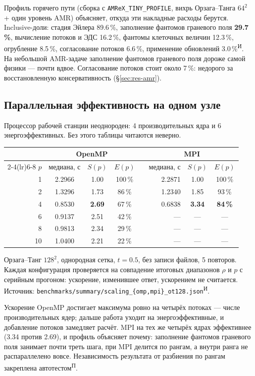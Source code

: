 \documentclass[12pt,a4paper]{article}
\newcommand{\code}[1]{\texttt{#1}}
\newcommand{\Pv}{\textsuperscript{\scriptsize П}}   %
\newcommand{\Iz}{\textsuperscript{\scriptsize И}}    %
\begin{document}
Профиль горячего пути (сборка с \code{AMReX\_TINY\_PROFILE}, вихрь
Орзага--Танга $64^2$ + один уровень AMR) объясняет, откуда эти накладные расходы
берутся. Inclusive-доли: стадия Эйлера 89.6\,\%, заполнение фантомов граневого
поля \textbf{29.7\,\%}, вычисление потоков и ЭДС 16.2\,\%, фантомы клеточных
величин 12.3\,\%, огрубление 8.5\,\%, согласование потоков 6.6\,\%, применение
обновлений 3.0\,\%\Iz. На небольшой AMR-задаче заполнение фантомов граневого поля
дороже самой физики --- почти вдвое. Согласование потоков стоит около 7\,\%:
недорого за восстановленную консервативность (\S\ref{sec:res-amr}).

\subsection{Параллельная эффективность на одном узле}
\label{sec:res-scaling}

Процессор рабочей станции неоднороден: 4 производительных ядра и 6
энергоэффективных. Без этого таблицы читаются неверно.

\begin{center}\footnotesize
\begin{tabular}{rccccrcc}
\toprule
& \multicolumn{3}{c}{OpenMP} & & \multicolumn{3}{c}{MPI} \\
\cmidrule(lr){2-4}\cmidrule(lr){6-8}
$p$ & медиана, с & $S(p)$ & $E(p)$ & & медиана, с & $S(p)$ & $E(p)$ \\
\midrule
1  & 2.2966 & 1.00 & 100\,\% & & 2.2871 & 1.00 & 100\,\% \\
2  & 1.3296 & 1.73 & 86\,\%  & & 1.2340 & 1.85 & 93\,\% \\
4  & 0.8530 & \textbf{2.69} & 67\,\% & & 0.6838 & \textbf{3.34} & \textbf{84\,\%} \\
6  & 0.9137 & 2.51 & 42\,\%  & & --- & --- & --- \\
8  & 0.9813 & 2.34 & 29\,\%  & & --- & --- & --- \\
10 & 1.0400 & 2.21 & 22\,\%  & & --- & --- & --- \\
\bottomrule
\end{tabular}
\end{center}
\noindent\footnotesize
Орзага--Танг $128^2$, однородная сетка, $t=0.5$, без записи файлов, 5 повторов.
Каждая конфигурация проверяется на совпадение итоговых диапазонов $\rho$ и $p$
с серийным прогоном: ускорение, изменившее ответ, ускорением не считается.
Источник: \code{benchmarks/summary/scaling\_\{omp,mpi\}\_ot128.json}\Iz.\normalsize

\medskip
Ускорение OpenMP достигает максимума ровно на четырёх потоках --- числе
производительных ядер; дальше работа уходит на энергоэффективные, и добавление
потоков замедляет расчёт. MPI на тех же четырёх ядрах эффективнее (3.34 против
2.69), и профиль объясняет почему: заполнение фантомов граневого поля занимает
почти треть шага, при MPI делится по рангам, а внутри ранга не распараллелено
вовсе. Независимость результата от разбиения по рангам закреплена автотестом\Pv.
\end{document}
